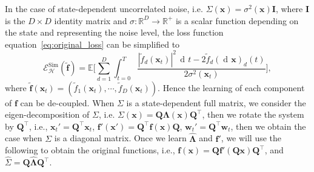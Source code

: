 \documentclass[11pt]{article} %
\def\eqref#1{equation~\ref{#1}}
\def\rvw{{\mathbf{w}}}
\def\rvx{{\mathbf{x}}}
\def\vf{{\bm{f}}}
\def\vx{{\bm{x}}}
\def\mI{{\bm{I}}}
\def\mQ{{\bm{Q}}}
\def\mLambda{{\bm{\Lambda}}}
\def\gH{{\mathcal{H}}}
\newcommand{\E}{\mathbb{E}}
\newcommand{\R}{\mathbb{R}}
\DeclareMathOperator{\dif}{d \!}        %
\newcommand{\dt}{\dif t}
\newcommand{\loss}{\mathcal{E}}
\begin{document}
In the case of state-dependent uncorrelated noise, i.e. $\Sigma(\vx) = \sigma^2(\vx)\mI$, where $\mI$ is the $D \times D$ identity matrix and $\sigma: \R^D \rightarrow \R^+$ is a scalar function depending on the state and representing the noise level, the loss function \eqref{eq:original_loss} can be simplified to
\begin{equation}\label{eq:simple_loss}
\loss_{\gH}^{\text{Sim}}(\tilde\vf) =\E\Big[\sum_{d = 1}^D\int_{t = 0}^T\frac{|\tilde{f}_d(\rvx_t)|^2\,\dt - 2\tilde{f}_d(\dif\rvx)_d(t)}{2\sigma^2(\rvx_t)}\Big],
\end{equation}
where $\tilde\vf(\rvx_t) = (\tilde{f}_1(\rvx_t), \cdots, \tilde{f}_D(\rvx_t))$.  Hence the learning of each component of $\vf$ can be de-coupled.  When $\Sigma$ is a state-dependent full matrix, we consider the eigen-decomposition of $\Sigma$, i.e. $\Sigma(\vx) = \mQ\mLambda(\vx)\mQ^\intercal$, then we rotate the system by $\mQ^\intercal$, i.e., $\rvx_t' = \mQ^\intercal\rvx_t$, $\vf'(\vx') = \mQ^\intercal\vf(\vx)\mQ$, $\rvw_t' = \mQ^\intercal\rvw_t$, then we obtain the case when $\Sigma$ is a diagonal matrix.  Once we learn $\hat\mLambda$ and $\vf'$, we will use the following to obtain the original functions, i.e., $\vf(\vx) = \mQ\vf'(\mQ\vx)\mQ^\intercal$, and $\hat\Sigma = \mQ\hat\mLambda\mQ^\intercal$.
%
\end{document}
